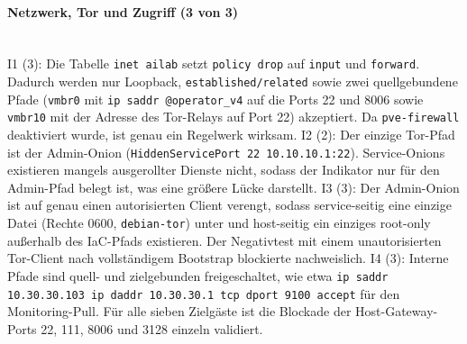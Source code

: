 \paragraph{Netzwerk, Tor und Zugriff (3 von 3)} \mbox{}\\
I1 (3): Die Tabelle \texttt{inet ailab} setzt \texttt{policy drop} auf \texttt{input} und \texttt{forward}. Dadurch werden nur Loopback, \texttt{established/related} sowie zwei quellgebundene Pfade (\texttt{vmbr0} mit \texttt{ip saddr @operator\_v4} auf die Ports 22 und 8006
sowie \texttt{vmbr10} mit der Adresse des Tor-Relays auf Port 22) akzeptiert.
Da \texttt{pve-firewall} deaktiviert wurde, ist genau ein Regelwerk wirksam.\cite{section4scriptB,finalsummaryB, proxmoxFirewall}
I2 (2): Der einzige Tor-Pfad ist der Admin-Onion (\texttt{HiddenServicePort 22 10.10.10.1:22}). Service-Onions existieren mangels ausgerollter Dienste nicht, sodass der Indikator nur für den
Admin-Pfad belegt ist, was eine größere Lücke darstellt.\cite{section4scriptB,finalsummaryB}
I3 (3): Der Admin-Onion ist auf genau einen autorisierten Client verengt, sodass service-seitig eine einzige Datei  (Rechte 0600, \texttt{debian-tor}) unter  und host-seitig ein einziges root-only  außerhalb des \ac{IaC}-Pfads existieren.
Der Negativtest mit einem unautorisierten Tor-Client nach vollständigem Bootstrap blockierte nachweislich.\cite{implementationlogB,validatornotesB,torprojectClientAuth}
I4 (3): Interne Pfade sind quell- und zielgebunden freigeschaltet, wie etwa \texttt{ip saddr 10.30.30.103 ip daddr 10.30.30.1 tcp dport 9100 accept} für den Monitoring-Pull.
Für alle sieben Zielgäste ist die Blockade der Host-Gateway-Ports 22, 111, 8006 und 3128 einzeln validiert.\cite{section5scriptB,implementationlogB,finalsummaryB}


